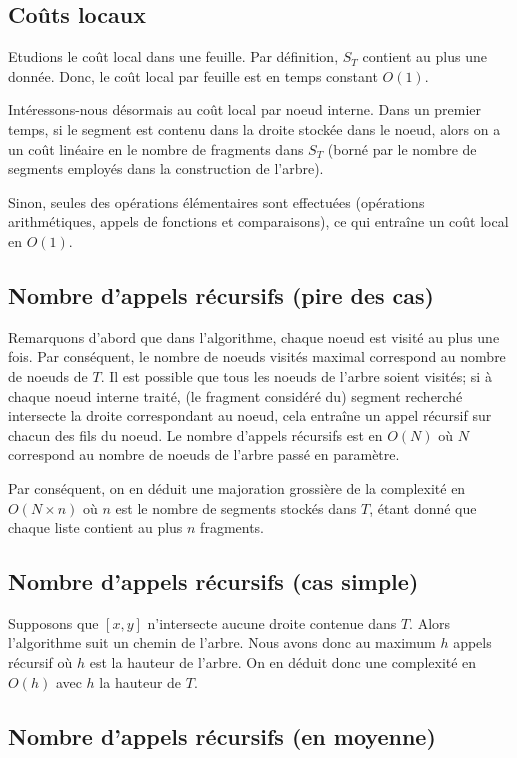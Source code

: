 \subsection{Coûts locaux}
Etudions le coût local dans une feuille.
Par définition, $S_T$ contient au plus une donnée.
Donc, le coût local par feuille est en temps constant $O(1)$.

Intéressons-nous désormais au coût local par noeud interne.
Dans un premier temps, si le segment est contenu dans
la droite stockée dans le noeud, alors on a un coût linéaire
en le nombre de fragments dans $S_T$ (borné par le nombre de
segments employés dans la construction de l'arbre).

Sinon, seules des opérations élémentaires sont
effectuées (opérations arithmétiques, appels de fonctions
et comparaisons), ce qui entraîne un coût local en $O(1)$.

\subsection{Nombre d'appels récursifs (pire des cas)}
Remarquons d'abord que dans l'algorithme, chaque noeud est
visité au plus une fois.
Par conséquent, le nombre de noeuds visités maximal correspond
au nombre de noeuds de $T$.
Il est possible que tous les noeuds de l'arbre soient visités;
si à chaque noeud interne traité, (le fragment considéré du)
segment recherché intersecte la droite correspondant au noeud,
cela entraîne un appel récursif sur chacun des fils du noeud.
Le nombre d'appels récursifs est en $O(N)$ où $N$ correspond
au nombre de noeuds de l'arbre passé en paramètre.

Par conséquent, on en déduit une majoration grossière de
la complexité en $O(N \times n)$ où $n$ est le nombre de
segments stockés dans $T$, étant donné que chaque liste contient
au plus $n$ fragments.

\subsection{Nombre d'appels récursifs (cas simple)}
Supposons que $[x,y]$ n'intersecte aucune droite contenue dans $T$.
Alors l'algorithme suit un chemin de l'arbre. Nous avons donc
au maximum $h$ appels récursif où $h$ est la hauteur de l'arbre.
On en déduit donc une complexité en $O(h)$ avec $h$ la hauteur de
$T$.

\subsection{Nombre d'appels récursifs (en moyenne)}

